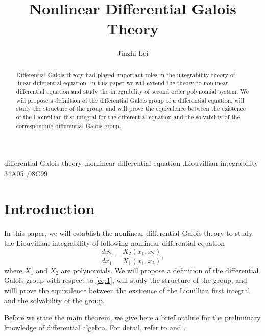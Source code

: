 \documentclass[preprint, 12pt]{elsarticle}
\numberwithin{equation}{section}
\begin{document}
\begin{frontmatter}


\title{Nonlinear Differential Galois Theory}

\author{Jinzhi Lei}
\address{Zhou Pei-Yuan Center for Applied Mathematics, 
Tsinghua University,
Beijing, 100084,
P.R.China}




\begin{abstract}
Differential Galois theory had played important roles in the integrability theory of linear
differential equation. In this paper we will extend the theory to nonlinear differential equation and study the integrability of second order polynomial system. We will propose a definition of the differential Galois group of a differential equation, will study the structure of the group, and will prove the equivalence between the existence of the Liouvillian first integral for the differential equation and the solvability of the corresponding differential Galois group.
\end{abstract}
\begin{keyword}
differential Galois theory \sep nonlinear
differential equation \sep Liouvillian integrability
\MSC 34A05 \sep 08C99
\end{keyword}


\end{frontmatter}
\section{Introduction}
\label{sec:0}
In this paper, we will establish the nonlinear differential Galois theory to study the Liouvillian integrability of following nonlinear differential equation
\begin{equation}
\label{eq:1} \dfrac{d x_2}{d x_1} = \dfrac{X_2(x_1,x_2)}{X_1(x_1,x_2)},
\end{equation}
where $X_1$ and $X_2$ are polynomials.  We will propose a definition of the differential Galois group with respect to \eqref{eq:1}, will study the structure of the group, and willl prove the equivalence between the exstience of the Liouillian first integral and the solvability of the group. 

Before we state the main theorem, we give here a brief
outline for the preliminary knowledge of differential
algebra. For detail, refer to \cite{Ka:76} and \cite{Ritt:50}.
\end{document}
